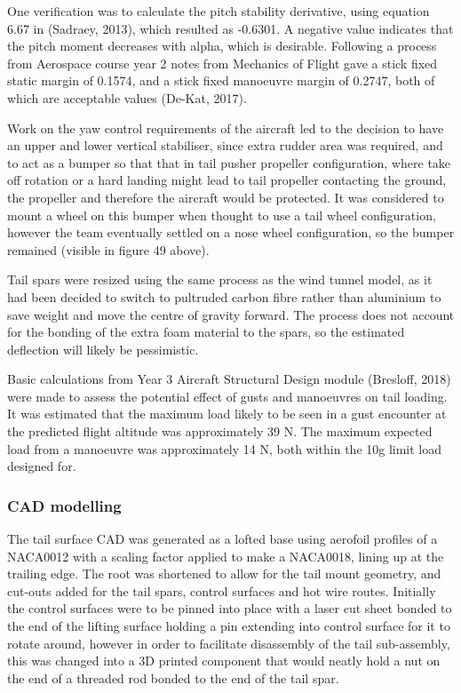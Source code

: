 \documentclass[../../main.tex]{subfiles}
\begin{document}

One verification was to calculate the pitch stability derivative, using equation 6.67 in (Sadraey, 2013), which resulted as -0.6301.
A negative value indicates that the pitch moment decreases with alpha, which is desirable.
Following a process from Aerospace course year 2 notes from Mechanics of Flight gave a stick fixed static margin of 0.1574, and a stick fixed manoeuvre margin of 0.2747, both of which are acceptable values (De-Kat, 2017). 

Work on the yaw control requirements of the aircraft led to the decision to have an upper and lower vertical stabiliser, since extra rudder area was required, and to act as a bumper so that that in tail pusher propeller configuration, where take off rotation or a hard landing might lead to tail propeller contacting the ground, the propeller and therefore the aircraft would be protected.
It was considered to mount a wheel on this bumper when thought to use a tail wheel configuration, however the team eventually settled on a nose wheel configuration, so the bumper remained (visible in figure 49 above). 

Tail spars were resized using the same process as the wind tunnel model, as it had been decided to switch to pultruded carbon fibre rather than aluminium to save weight and move the centre of gravity forward.
The process does not account for the bonding of the extra foam material to the spars, so the estimated deflection will likely be pessimistic.  

Basic calculations from Year 3 Aircraft Structural Design module (Bresloff, 2018) were made to assess the potential effect of gusts and manoeuvres on tail loading.
It was estimated that the maximum load likely to be seen in a gust encounter at the predicted flight altitude was approximately 39 N.
The maximum expected load from a manoeuvre was approximately 14 N, both within the 10g limit load designed for. 

\subsubsection{CAD modelling} \label{sec:design-process:final-design-proposal:tail:cad-modelling}

The tail surface CAD was generated as a lofted base using aerofoil profiles of a NACA0012 with a scaling factor applied to make a NACA0018, lining up at the trailing edge.
The root was shortened to allow for the tail mount geometry, and cut-outs added for the tail spars, control surfaces and hot wire routes.
Initially the control surfaces were to be pinned into place with a laser cut sheet bonded to the end of the lifting surface holding a pin extending into control surface for it to rotate around, however in order to facilitate disassembly of the tail sub-assembly, this was changed into a 3D printed component that would neatly hold a nut on the end of a threaded rod bonded to the end of the tail spar.
\end{document}
